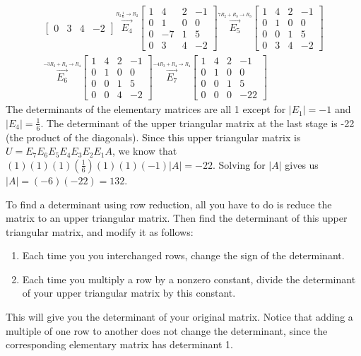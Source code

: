\begin{example}
\begin{align*}
\begin{bmatrix}
 0 & 3 & 4 & -2 
\end{bmatrix}
\stackrel{\xrightarrow{R_2\frac{1}{6}\to R_2}}{E_4}
\begin{bmatrix}
 1 & 4 & 2 & -1\\
 0 & 1 & 0 & 0 \\
 0 & -7 & 1 & 5 \\
 0 & 3 & 4 & -2 
\end{bmatrix}
\stackrel{\xrightarrow{7R_2+R_3\to R_3}}{E_5}
\begin{bmatrix}
 1 & 4 & 2 & -1\\
 0 & 1 & 0 & 0 \\
 0 & 0 & 1 & 5 \\
 0 & 3 & 4 & -2 
\end{bmatrix}
\\
\stackrel{\xrightarrow{-3R_2+R_4\to R_4}}{E_6}
\begin{bmatrix}
 1 & 4 & 2 & -1\\
 0 & 1 & 0 & 0 \\
 0 & 0 & 1 & 5 \\
 0 & 0 & 4 & -2 
\end{bmatrix}
\stackrel{\xrightarrow{-4R_3+R_4\to R_4}}{E_7}
\begin{bmatrix}
 1 & 4 & 2 & -1\\
 0 & 1 & 0 & 0 \\
 0 & 0 & 1 & 5 \\
 0 & 0 & 0 & -22 
\end{bmatrix}
\end{align*}
The determinants of the elementary matrices are all 1 except for $|E_1|=-1$ and $|E_4|=\frac{1}{6}$.  
The determinant of the upper triangular matrix at the last stage is -22 (the product of the diagonals).    
Since this upper triangular matrix is  $U=E_7E_6E_5E_4E_3E_2E_1A$, we know that $(1)(1)(1)(\frac{1}{6})(1)(1)(-1)|A|=-22$. Solving for $|A|$ gives us $|A|=(-6)(-22)=132$. 

\end{example}

To find a determinant using row reduction, all you have to do is reduce the matrix to an upper triangular matrix. Then find the determinant of this upper triangular matrix, and modify it as follows: 
\begin{enumerate}
	\item Each time you you interchanged rows, change the sign of the determinant. 
	\item Each time you  multiply a row by a nonzero constant, divide the determinant of your upper triangular matrix by this constant.  
\end{enumerate}
This will give you the determinant of your original matrix.  Notice that adding a multiple of one row to another does not change the determinant, since the corresponding elementary matrix has determinant 1.


